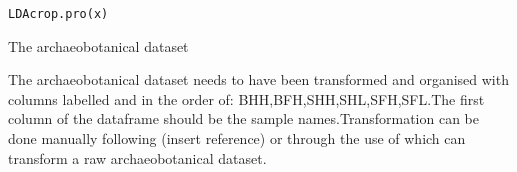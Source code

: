 \documentclass[a4paper]{book}
\begin{document}
%
\begin{Usage}
\begin{verbatim}
LDAcrop.pro(x)
\end{verbatim}
\end{Usage}
%
\begin{Arguments}
\begin{ldescription}
\item[\code{x}] The archaeobotanical dataset

\end{ldescription}
\end{Arguments}
%
\begin{Details}\relax
The archaeobotanical dataset needs to have been transformed and organised with columns labelled and in the order of: BHH,BFH,SHH,SHL,SFH,SFL.The first column of the dataframe should be the sample names.Transformation can be done manually following (insert reference) or through the use of  which can transform a raw archaeobotanical dataset.

\end{Details}
%
\end{document}
